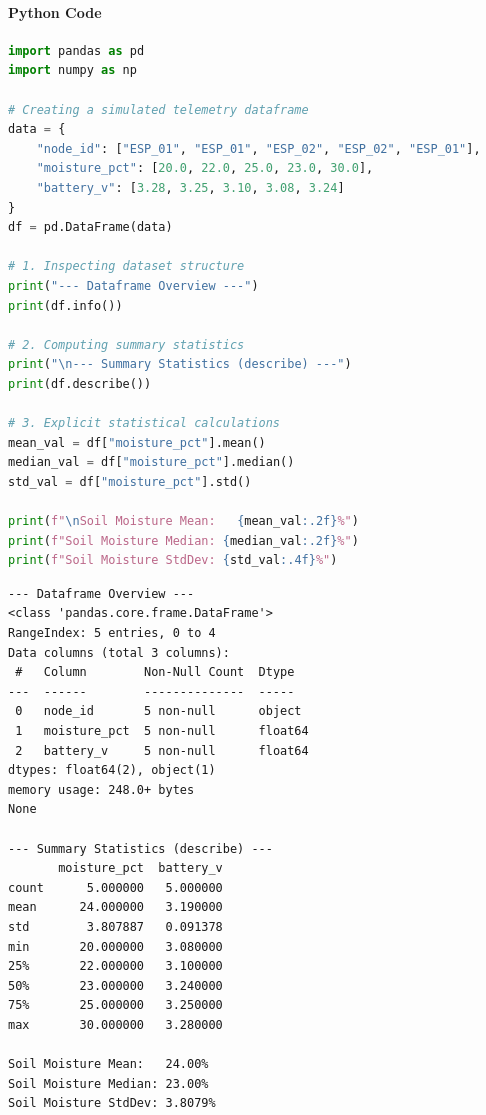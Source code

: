 \paragraph{Python Code}
\begin{lstlisting}[language=Python]
import pandas as pd
import numpy as np

# Creating a simulated telemetry dataframe
data = {
    "node_id": ["ESP_01", "ESP_01", "ESP_02", "ESP_02", "ESP_01"],
    "moisture_pct": [20.0, 22.0, 25.0, 23.0, 30.0],
    "battery_v": [3.28, 3.25, 3.10, 3.08, 3.24]
}
df = pd.DataFrame(data)

# 1. Inspecting dataset structure
print("--- Dataframe Overview ---")
print(df.info())

# 2. Computing summary statistics
print("\n--- Summary Statistics (describe) ---")
print(df.describe())

# 3. Explicit statistical calculations
mean_val = df["moisture_pct"].mean()
median_val = df["moisture_pct"].median()
std_val = df["moisture_pct"].std()

print(f"\nSoil Moisture Mean:   {mean_val:.2f}%")
print(f"Soil Moisture Median: {median_val:.2f}%")
print(f"Soil Moisture StdDev: {std_val:.4f}%")
\end{lstlisting}

\begin{lstlisting}[style=outputstyle]
--- Dataframe Overview ---
<class 'pandas.core.frame.DataFrame'>
RangeIndex: 5 entries, 0 to 4
Data columns (total 3 columns):
 #   Column        Non-Null Count  Dtype  
---  ------        --------------  -----  
 0   node_id       5 non-null      object 
 1   moisture_pct  5 non-null      float64
 2   battery_v     5 non-null      float64
dtypes: float64(2), object(1)
memory usage: 248.0+ bytes
None

--- Summary Statistics (describe) ---
       moisture_pct  battery_v
count      5.000000   5.000000
mean      24.000000   3.190000
std        3.807887   0.091378
min       20.000000   3.080000
25%       22.000000   3.100000
50%       23.000000   3.240000
75%       25.000000   3.250000
max       30.000000   3.280000

Soil Moisture Mean:   24.00%
Soil Moisture Median: 23.00%
Soil Moisture StdDev: 3.8079%
\end{lstlisting}

